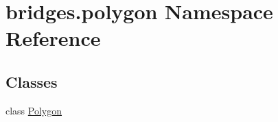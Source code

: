 \hypertarget{namespacebridges_1_1polygon}{}\section{bridges.\+polygon Namespace Reference}
\label{namespacebridges_1_1polygon}
\subsection*{Classes}
\begin{DoxyCompactItemize}
\item 
class \hyperlink{classbridges_1_1polygon_1_1_polygon}{Polygon}
\end{DoxyCompactItemize}
